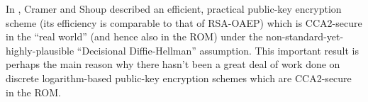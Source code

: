 In \cite{cramer:cca2secure}, Cramer and Shoup described an efficient,
practical public-key encryption scheme (its efficiency is comparable to that
of RSA-OAEP) which is CCA2-secure in the ``real world'' (and hence also in the
ROM) under the non-standard-yet-highly-plausible ``Decisional Diffie-Hellman''
assumption.  This important result is perhaps the main reason why there hasn't been
a great deal of work done on discrete logarithm-based public-key encryption schemes which are
CCA2-secure in the ROM.
%
%
%
% 
